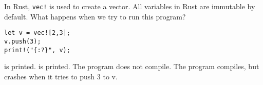 %
%
In Rust, \texttt{vec!} is used to create a vector. All variables in Rust are immutable by default. What happens when we try to run this program?
\begin{lstlisting}
let v = vec![2,3];
v.push(3);
print!("{:?}", v);
\end{lstlisting}

\choice {[2,3,2]} is printed.
\choice {[2,2,2,3]} is printed.
\choice The program does not compile.
\choice The program compiles, but crashes when it tries to push 3 to v.

